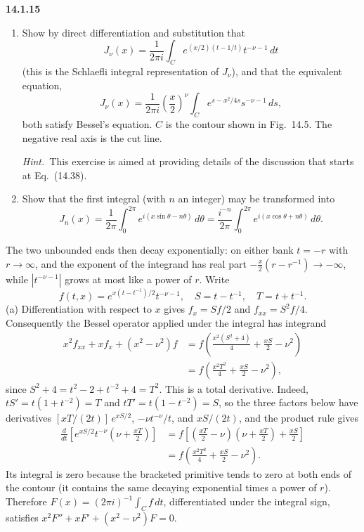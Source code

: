 \par\bigskip
\noindent\textbf{14.1.15}
\begin{enumerate}
\item[(a)] Show by direct differentiation and substitution that
\[
J_{\nu}(x)=\frac{1}{2\pi i}\int_{C}e^{(x/2)(t-1/t)}t^{-\nu-1}\,dt
\]
(this is the Schlaefli integral representation of $J_{\nu}$), and that
the equivalent equation,
\[
J_{\nu}(x)=\frac{1}{2\pi i}\left(\frac{x}{2}\right)^{\nu}
\int_{C}e^{s-x^{2}/4s}s^{-\nu-1}\,ds,
\]
both satisfy Bessel's equation. $C$ is the contour shown in
Fig.~14.5. The negative real axis is the cut line.
\par\emph{Hint.}~This exercise is aimed at providing details of the
discussion that starts at Eq.~(14.38).
\item[(b)] Show that the first integral (with $n$ an integer) may be
transformed into
\[
J_{n}(x)=\frac{1}{2\pi}\int_{0}^{2\pi}e^{i(x\sin\theta-n\theta)}\,d\theta
=\frac{i^{-n}}{2\pi}\int_{0}^{2\pi}e^{i(x\cos\theta+n\theta)}\,d\theta.
\]
\end{enumerate}
\par{}
\solution
{}
The two unbounded ends then decay exponentially: on either bank
$t=-r$ with $r\to\infty$, and the exponent of the integrand has real
part $-\frac x2(r-r^{-1})\to-\infty$, while $|t^{-\nu-1}|$ grows at
most like a power of $r$. Write
\[
f(t,x)=e^{x(t-t^{-1})/2}t^{-\nu-1},\quad
S=t-t^{-1},\quad T=t+t^{-1}.
\]
(a) Differentiation with respect to $x$ gives $f_x=Sf/2$ and
$f_{xx}=S^2f/4$. Consequently the Bessel operator applied under the
integral has integrand
\begin{align*}
x^2f_{xx}+xf_x+(x^2-\nu^2)f
&=f\left(\frac{x^2(S^2+4)}{4}+\frac{xS}{2}-\nu^2\right)\\
&=f\left(\frac{x^2T^2}{4}+\frac{xS}{2}-\nu^2\right),
\end{align*}
since $S^2+4=t^2-2+t^{-2}+4=T^2$. This is a total derivative.
Indeed, $tS'=t(1+t^{-2})=T$ and $tT'=t(1-t^{-2})=S$, so the three
factors below have derivatives $[xT/(2t)]\,e^{xS/2}$, $-\nu t^{-\nu}/t$,
and $xS/(2t)$, and the product rule gives
\begin{align*}
\frac d{dt}\left[e^{xS/2}t^{-\nu}
 \left(\nu+\frac{xT}{2}\right)\right]
&=f\left[\left(\frac{xT}{2}-\nu\right)
 \left(\nu+\frac{xT}{2}\right)+\frac{xS}{2}\right]\\
&=f\left(\frac{x^2T^2}{4}+\frac{xS}{2}-\nu^2\right).
\end{align*}
Its integral is zero because the bracketed primitive tends to zero at
both ends of the contour (it contains the same decaying exponential
times a power of $r$). Therefore $F(x)=(2\pi i)^{-1}\int_C f\,dt$,
differentiated under the integral sign, satisfies
$x^2F''+xF'+(x^2-\nu^2)F=0$.


